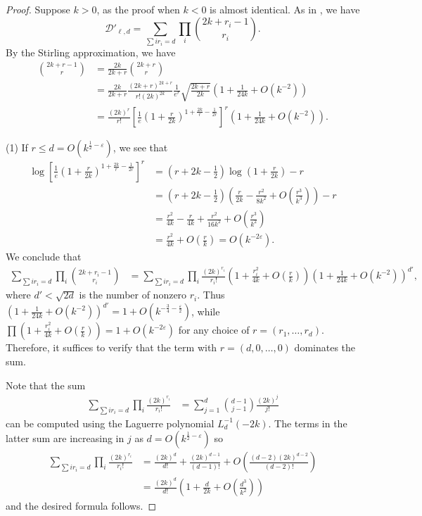 \documentclass[12pt]{amsart}
\theoremstyle{plain} %
\theoremstyle{definition}
\theoremstyle{remark}
\numberwithin{equation}{section}
\begin{document}
\begin{proof}
Suppose $k>0$, as the proof when $k<0$ is almost identical.
As in \cite[\S4]{rudnick:faber}, we have 
\[\mathcal{D}'_{\ell,d}=\sum_{\sum i
  r_i=d}\prod_i\binom{2k+r_i-1}{r_i}.\]
By the Stirling approximation, we have
\begin{align*}
  \binom{2k+r-1}{r}&=\frac{2k}{2k+r}\binom{2k+r}{r}\\
  &=\frac{2k}{2k+r}\frac{(2k+r)^{2k+r}}{r!(2k)^{2k}}\frac{1}{e^r}\sqrt{\frac{2k+r}{2k}}\left(1+\frac{1}{24k}+O(k^{-2})\right)\\
  &=\frac{(2k)^r}{r!}\left[\frac{1}{e}\left(1+\frac{r}{2k}\right)^{1+\frac{2k}{r}-\frac{1}{2r}}\right]^r\left(1+\frac{1}{24k}+O(k^{-2})\right).
\end{align*}

(1) If $r\leq d=O(k^{\frac{1}{2}-\varepsilon})$, we see that
\begin{align*}
\log
  \left[\frac{1}{e}\left(1+\frac{r}{2k}\right)^{1+\frac{2k}{r}-\frac{1}{2r}}\right]^r&=(r+2k-\frac{1}{2})\log
                                                                            \left(1+\frac{r}{2k}\right)-r\\
  &=(r+2k-\frac{1}{2})\left(\frac{r}{2k}-\frac{r^2}{8k^2}+O\left(\frac{r^3}{k^3}\right)\right)-r\\
  &=\frac{r^2}{4k}-\frac{r}{4k}+\frac{r^2}{16k^2}+O\left(\frac{r^3}{k^2}\right)\\
 &=\frac{r^2}{4k}+O\left(\frac{r}{k}\right)=O(k^{-2 \varepsilon}).
\end{align*}
We conclude that
\begin{align*}
\sum_{\sum i
  r_i=d}\prod_i\binom{2k+r_i-1}{r_i}&=\sum_{\sum i
  r_i=d}\prod_i\frac{(2k)^{r_i}}{r_i!} \left(1+\frac{r_i^2}{4k}+O\left(\frac{r}{k}\right)\right)\left(1+\frac{1}{24k}+O(k^{-2})\right)^{d'},
\end{align*}
where $d'<\sqrt{2d}$ is the number of nonzero $r_i$. Thus
$\left(1+\frac{1}{24k}+O(k^{-2})\right)^{d'}=1+O(k^{-\frac{3}{4}-\frac{\varepsilon}{2}})$,
while $\prod
\left(1+\frac{r_i^2}{4k}+O\left(\frac{r}{k}\right)\right)=1+O(k^{-2
  \varepsilon})$ for any choice of $r=(r_1,\ldots,
r_d)$. Therefore, it suffices to verify that the term with
$r=(d,0,\ldots,0)$ dominates the sum.

Note that the sum
\begin{align*}
\sum_{\sum i
  r_i=d}\prod_i\frac{(2k)^{r_i}}{r_i!}&=\sum_{j=1}^d\binom{d-1}{j-1}\frac{(2k)^j}{j!}
\end{align*}
can be computed using the Laguerre polynomial
$L_d^{-1}(-2k)$. The terms in the latter sum are increasing in
$j$ as $d=O(k^{\frac{1}{2}-\varepsilon})$ so
\begin{align*}
\sum_{\sum i
  r_i=d}\prod_i\frac{(2k)^{r_i}}{r_i!}&=\frac{(2k)^d}{d!}+\frac{(2k)^{d-1}}{(d-1)!}+O\left(\frac{(d-2)(2k)^{d-2}}{(d-2)!}\right)\\
  &=\frac{(2k)^d}{d!}\left(1+\frac{d}{2k}+O\left(\frac{d^3}{k^2}\right)\right)
\end{align*}
and the desired formula follows.


\end{proof}
\end{document}
